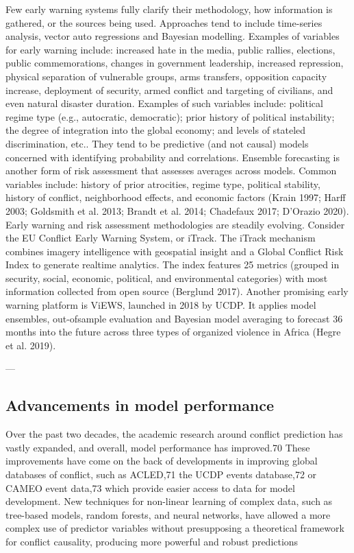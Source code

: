 \documentclass[runningheads]{llncs}
\begin{document}
    Few early warning systems fully clarify their methodology, how information is gathered, or the sources being used. Approaches tend to include time-series analysis, vector auto regressions and Bayesian modelling. Examples of variables for early warning include: increased hate in the media, public rallies, elections, public commemorations, changes in government leadership, increased repression, physical separation of vulnerable groups, arms transfers, opposition capacity increase, deployment of security, armed conflict and targeting of civilians, and even natural disaster duration. Examples of such variables include: political regime type (e.g., autocratic, democratic); prior history of political instability; the degree of integration into the global economy; and levels of stateled discrimination, etc.. They tend to be predictive (and not causal) models concerned with identifying probability and correlations. Ensemble forecasting is another form of risk assessment that assesses averages across models. Common variables include: history of prior atrocities, regime type, political stability, history of conflict, neighborhood effects, and economic factors (Krain 1997; Harff 2003; Goldsmith et al. 2013; Brandt et al. 2014; Chadefaux 2017; D’Orazio 2020). Early warning and risk assessment methodologies are steadily evolving. Consider the EU Conflict Early Warning System, or iTrack. The iTrack mechanism combines imagery intelligence with geospatial insight and a Global Conflict Risk Index to generate realtime analytics. The index features 25 metrics (grouped in security, social, economic, political, and environmental categories) with most information collected from open source (Berglund 2017). Another promising early warning platform is ViEWS, launched in 2018 by UCDP. It applies model ensembles, out-ofsample evaluation and Bayesian model averaging to forecast 36 months into the future across three types of organized violence in Africa (Hegre et al. 2019).


    ---

    \subsection{ Advancements in model performance}
    Over the past two decades, the academic research around conflict prediction has vastly expanded, and
    overall, model performance has improved.70 These improvements have come on the back of developments
    in improving global databases of conflict, such as ACLED,71 the UCDP events database,72 or CAMEO event
    data,73 which provide easier access to data for model development. New techniques for non-linear learning
    of complex data, such as tree-based models, random forests, and neural networks, have allowed a more
    complex use of predictor variables without presupposing a theoretical framework for conflict causality,
    producing more powerful and robust predictions
\end{document}
